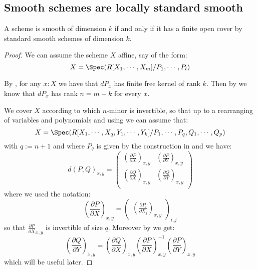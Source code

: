 \subsection{Smooth schemes are locally standard smooth}

\begin{proposition}\label{smooth-are-locally-standard}
A scheme is smooth of dimension $k$ if and only if it has a finite open cover by standard smooth schemes of dimension $k$.
\end{proposition}

\begin{proof}
We can assume the scheme $X$ affine, say of the form:
\[X = \Spec(R[X_1,\cdots,X_m]/P_1,\cdots,P_l)\]

By , for any $x:X$ we have that $dP_x$ has finite free kernel of rank $k$. Then by  we know that $dP_x$ has rank $n=m-k$ for every $x$.

We cover $X$ according to which $n$-minor is invertible, so that up to a rearranging of variables and polynomials and using  we can assume that:
\[X = \Spec(R[X_1,\cdots,X_{q},Y_1,\cdots,Y_k]/P_1,\cdots,P_{q},Q_1,\cdots, Q_p)\]
with $q:=n+1$ and where $P_q$ is given by the construction in  and we have:
\[d(P,Q)_{x,y} = \begin{pmatrix}
\left(\frac{\partial P}{\partial X}\right)_{x,y} & \left(\frac{\partial P}{\partial Y}\right)_{x,y} \\
\left(\frac{\partial Q}{\partial X}\right)_{x,y} & \left(\frac{\partial Q}{\partial Y}\right)_{x,y} \\
\end{pmatrix}\]
where we used the notation:
\[\left(\frac{\partial P}{\partial X}\right)_{x,y} = \begin{pmatrix}\left(\frac{\partial P_i}{\partial X_j}\right)_{x,y}\end{pmatrix}_{i,j}\]
so that $\frac{\partial P}{\partial X}_{x,y}$ is invertible of size $q$. Moreover by  we get:
\[\left(\frac{\partial Q}{\partial Y}\right)_{x,y} = \left(\frac{\partial Q}{\partial X}\right)_{x,y}\left(\frac{\partial P}{\partial X}\right)_{x,y}^{-1} \left(\frac{\partial P}{\partial Y}\right)_{x,y} \]
which will be useful later.


\end{proof}
